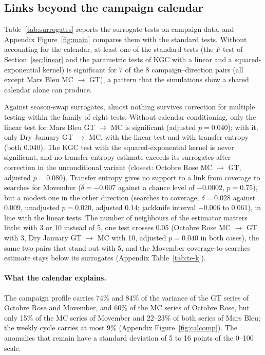 \documentclass[11pt,a4paper]{article}
\begin{document}
\subsection{Links beyond the campaign calendar}\label{sec:beyond}
Table~\ref{tab:surrogates} reports the surrogate tests on campaign data, and Appendix Figure~\ref{fig:main} compares them with the standard tests. Without accounting for the calendar, at least one of the standard tests (the $F$-test of Section~\ref{sec:linear} and the parametric tests of KGC with a linear and a squared-exponential kernel) is significant for 7 of the 8 campaign--direction pairs (all except Mars Bleu MC $\to$ GT), a pattern that the simulations show a shared calendar alone can produce.

Against season-swap surrogates, almost nothing survives correction for multiple testing within the family of eight tests. Without calendar conditioning, only the linear test for Mars Bleu GT $\to$ MC is significant (adjusted $p=0.040$); with it, only Dry January GT $\to$ MC, with the linear test and with transfer entropy (both 0.040). The KGC test with the squared-exponential kernel is never significant, and no transfer-entropy estimate exceeds its surrogates after correction in the unconditional variant (closest: Octobre Rose MC $\to$ GT, adjusted $p=0.080$). Transfer entropy gives no support to a link from coverage to searches for Movember ($\delta=-0.007$ against a chance level of $-0.0002$, $p=0.75$), but a modest one in the other direction (searches to coverage, $\delta=0.028$ against 0.009, unadjusted $p=0.020$, adjusted 0.14; jackknife interval $-0.006$ to 0.061), in line with the linear tests. The number of neighbours of the estimator matters little: with 3 or 10 instead of 5, one test crosses 0.05 (Octobre Rose MC $\to$ GT with 3, Dry January GT $\to$ MC with 10, adjusted $p=0.040$ in both cases), the same two pairs that stand out with 5, and the Movember coverage-to-searches estimate stays below its surrogates (Appendix Table~\ref{tab:te-k}).

\paragraph{What the calendar explains.} The campaign profile carries 74\% and 84\% of the variance of the GT series of Octobre Rose and Movember, and 60\% of the MC series of Octobre Rose, but only 15\% of the MC series of Movember and 22--23\% of both series of Mars Bleu; the weekly cycle carries at most 9\% (Appendix Figure~\ref{fig:calcomp}). The anomalies that remain have a standard deviation of 5 to 16 points of the 0--100 scale.
\end{document}
